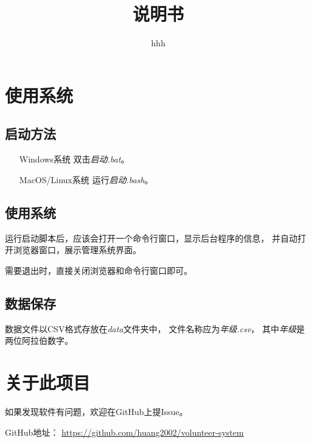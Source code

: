 \documentclass[12pt,titlepage]{article}
\title{\systemname\\说明书}
\author{hhh}
\begin{document}
\maketitle

\tableofcontents
\thispagestyle{empty}
\setcounter{page}{0}

\pagestyle{headings}

\newpage
\section{使用系统}

\subsection{启动方法}

\begin{itemize}
    \item[Windows系统] 双击\textit{启动.bat}。
    \item[MacOS/Linux系统] 运行\textit{启动.bash}。
\end{itemize}

\subsection{使用系统}

运行启动脚本后，应该会打开一个命令行窗口，显示后台程序的信息，
并自动打开浏览器窗口，展示管理系统界面。

需要退出时，直接关闭浏览器和命令行窗口即可。

\subsection{数据保存}

数据文件以CSV格式存放在\textit{data}文件夹中，
文件名称应为\textit{年级.csv}，
其中\textit{年级}是两位阿拉伯数字。

\newpage
\section{关于此项目}

如果发现软件有问题，欢迎在GitHub上提Issue。

GitHub地址：
\url{https://github.com/huang2002/volunteer-system}
\end{document}
